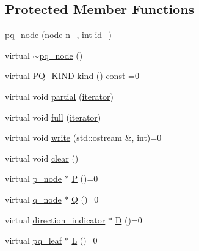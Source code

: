 \subsection*{Protected Member Functions}
\begin{DoxyCompactItemize}
\item 
\mbox{\hyperlink{classpq__node_a75720c94fd6e2865ba24c76ff66b33b2}{pq\+\_\+node}} (\mbox{\hyperlink{classnode}{node}} n\+\_\+, int id\+\_\+)
\item 
virtual \mbox{\hyperlink{classpq__node_ad23fe1826e949ceb746c37426bc1f8b4}{$\sim$pq\+\_\+node}} ()
\item 
virtual \mbox{\hyperlink{classpq__node_a96827bdca8bf81d20213405dd27f8fa6}{P\+Q\+\_\+\+K\+I\+ND}} \mbox{\hyperlink{classpq__node_aa9873c0cfad88bc4404857ce57d422e4}{kind}} () const =0
\item 
virtual void \mbox{\hyperlink{classpq__node_aa6830ab47a280f41fe61b7d2f8b508bb}{partial}} (\mbox{\hyperlink{classpq__node_a34898c9eb1527787c07e8ebefd6bfba5}{iterator}})
\item 
virtual void \mbox{\hyperlink{classpq__node_af1ba861293e4493dba7cc2c9332fee76}{full}} (\mbox{\hyperlink{classpq__node_a34898c9eb1527787c07e8ebefd6bfba5}{iterator}})
\item 
virtual void \mbox{\hyperlink{classpq__node_aab7bddb053b6b25b90be00cba7de97f9}{write}} (std\+::ostream \&, int)=0
\item 
virtual void \mbox{\hyperlink{classpq__node_a13100e0b030cc047f382d9ddf6a44f4a}{clear}} ()
\item 
virtual \mbox{\hyperlink{classp__node}{p\+\_\+node}} $\ast$ \mbox{\hyperlink{classpq__node_a72178a268ee1ece3ac106ac5fea3b12c}{P}} ()=0
\item 
virtual \mbox{\hyperlink{classq__node}{q\+\_\+node}} $\ast$ \mbox{\hyperlink{classpq__node_aeeefcfcd19dbe4ca94e190006e8dd484}{Q}} ()=0
\item 
virtual \mbox{\hyperlink{classdirection__indicator}{direction\+\_\+indicator}} $\ast$ \mbox{\hyperlink{classpq__node_a5c85bd25c32bb6f18d6d8d1bfd35f260}{D}} ()=0
\item 
virtual \mbox{\hyperlink{classpq__leaf}{pq\+\_\+leaf}} $\ast$ \mbox{\hyperlink{classpq__node_a805b6ef48c847380b47c8ba882ed4ee2}{L}} ()=0
\end{DoxyCompactItemize}
